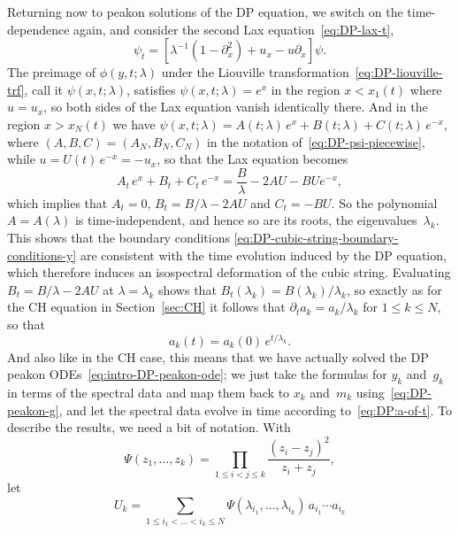 \documentclass[10pt,a4paper]{article} \pdfoutput=1 
\begin{document}
Returning now to peakon solutions of the DP equation,
we switch on the time-dependence again, and consider the second Lax equation~\eqref{eq:DP-lax-t},
\begin{equation*}
  \psi_t = \left[ \lambda^{-1} (1-\partial_x^2) + u_x - u \partial_x \right] \psi
  .
\end{equation*}
The preimage of $\phi(y,t;\lambda)$ under the Liouville transformation~\eqref{eq:DP-liouville-trf},
call it $\psi(x,t;\lambda)$, satisfies $\psi(x,t;\lambda) = e^x$ in the region $x < x_1(t)$ where $u = u_x$,
so both sides of the Lax equation vanish identically there.
And in the region $x > x_N(t)$ we have
$\psi(x,t;\lambda) = A(t;\lambda) \, e^x + B(t;\lambda) + C(t;\lambda) \, e^{-x}$,
where $(A,B,C)=(A_N,B_N,C_N)$ in the notation of~\eqref{eq:DP-psi-piecewise},
while $u=U(t) \, e^{-x} = -u_x$,
so that the Lax equation becomes
\begin{equation*}
  A_t \, e^x + B_t + C_t \, e^{-x}
  = \frac{B}{\lambda} - 2 A U - B U e^{-x}
  ,
\end{equation*}
which implies that $A_t = 0$, $B_t = B/\lambda - 2 AU$ and $C_t = - BU$.
So the polynomial $A = A(\lambda)$ is time-independent, and hence so are its roots,
the eigenvalues~$\lambda_k$.
This shows that the boundary conditions \eqref{eq:DP-cubic-string-boundary-conditions-y}
are consistent with the time evolution induced by the DP equation,
which therefore induces an isospectral deformation of the cubic string.
Evaluating $B_t = B/\lambda - 2 AU$ at $\lambda = \lambda_k$
shows that $B_t(\lambda_k) = B(\lambda_k) / \lambda_k$,
so exactly as for the CH equation in Section~\ref{sec:CH}
it follows that $\partial_t a_k = a_k/\lambda_k$ for $1 \le  k \le N$,
so that
\begin{equation}
  \label{eq:DP:a-of-t}
  a_k(t) = a_k(0) \, e^{t/\lambda_k}
  .
\end{equation}
And also like in the CH case, this means that we have actually solved the DP
peakon ODEs~\eqref{eq:intro-DP-peakon-ode};
we just take the formulas for $y_k$ and~$g_k$ in terms of the spectral data
and map them back to $x_k$ and~$m_k$ using~\eqref{eq:DP-peakon-g},
and let the spectral data evolve in time according to~\eqref{eq:DP:a-of-t}.
To describe the results, we need a bit of notation.
With
\begin{equation}
  \Psi(z_1,\dots,z_k)
  = \prod_{1 \le i < j \le k} \frac{(z_i - z_j)^2}{z_i + z_j}
  ,
\end{equation}
let
\begin{equation}
  \label{eq:DP-def-Uk}
  U_k = \sum_{1 \le i_1 < \dots < i_k \le N} \Psi(\lambda_{i_1},\dots,\lambda_{i_k}) \, a_{i_1} \dotsm a_{i_k}
\end{equation}
\end{document}
